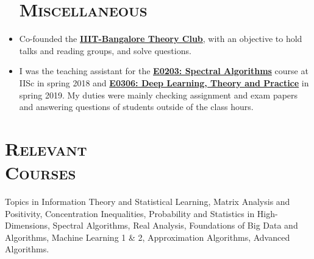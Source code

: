 \documentclass[line,margin]{res}
\begin{document}
\begin{resume}
\begin{itemize}
\section{\textsc{Miscellaneous}}
\item Co-founded the \href{https://iiitbtheoryclub.github.io/}{\bf IIIT-Bangalore Theory Club}, with an objective to hold talks and reading groups, and solve questions.
\item I was the teaching assistant for the \href{https://www.csa.iisc.ac.in/academics/academics-courses-desc.php}{\bf E0203: Spectral Algorithms} course at IISc in spring 2018 and \href{https://dltnp.github.io/}{\bf E0306: Deep Learning, Theory and Practice} in spring 2019. My duties were mainly checking assignment and exam papers and answering questions of students outside of the class hours.
\end{itemize}

\section{\textsc{Relevant \\ Courses}} Topics in Information Theory and Statistical Learning, Matrix Analysis and Positivity, Concentration Inequalities, Probability and Statistics in High-Dimensions, Spectral Algorithms, Real Analysis, Foundations of Big Data and Algorithms, Machine Learning 1 \& 2, Approximation Algorithms, Advanced Algorithms.

\end{resume}
\end{document}
